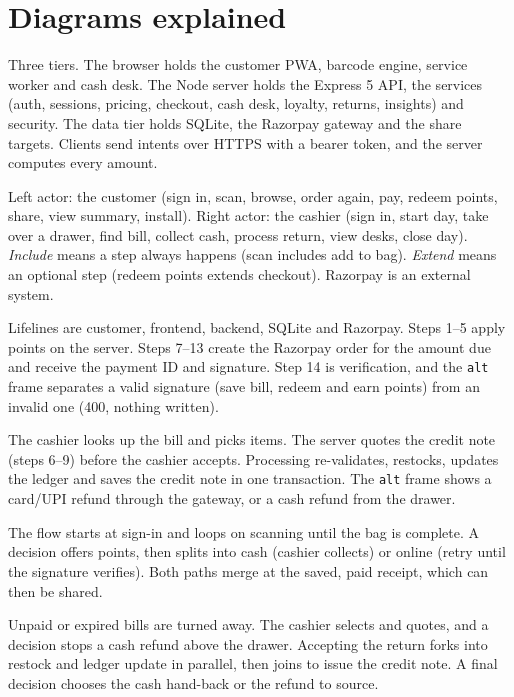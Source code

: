 \documentclass[10pt,a4paper]{article}
\begin{document}
\section{Diagrams explained}
\begin{description}[leftmargin=*,style=nextline,itemsep=2pt]
  \item[Figure 2.1: Architecture] Three tiers. The browser holds the customer PWA, barcode engine, service worker and cash desk. The Node server holds the Express 5 API, the services (auth, sessions, pricing, checkout, cash desk, loyalty, returns, insights) and security. The data tier holds SQLite, the Razorpay gateway and the share targets. Clients send intents over HTTPS with a bearer token, and the server computes every amount.
  \item[Figure 2.3: Use case] Left actor: the customer (sign in, scan, browse, order again, pay, redeem points, share, view summary, install). Right actor: the cashier (sign in, start day, take over a drawer, find bill, collect cash, process return, view desks, close day). \emph{Include} means a step always happens (scan includes add to bag). \emph{Extend} means an optional step (redeem points extends checkout). Razorpay is an external system.
  \item[Figure 2.4: Sequence, checkout with points] Lifelines are customer, frontend, backend, SQLite and Razorpay. Steps 1--5 apply points on the server. Steps 7--13 create the Razorpay order for the amount due and receive the payment ID and signature. Step 14 is verification, and the \texttt{alt} frame separates a valid signature (save bill, redeem and earn points) from an invalid one (400, nothing written).
  \item[Figure 2.5: Sequence, return] The cashier looks up the bill and picks items. The server quotes the credit note (steps 6--9) before the cashier accepts. Processing re-validates, restocks, updates the ledger and saves the credit note in one transaction. The \texttt{alt} frame shows a card/UPI refund through the gateway, or a cash refund from the drawer.
  \item[Figure 2.6: Activity, checkout] The flow starts at sign-in and loops on scanning until the bag is complete. A decision offers points, then splits into cash (cashier collects) or online (retry until the signature verifies). Both paths merge at the saved, paid receipt, which can then be shared.
  \item[Figure 2.7: Activity, return] Unpaid or expired bills are turned away. The cashier selects and quotes, and a decision stops a cash refund above the drawer. Accepting the return forks into restock and ledger update in parallel, then joins to issue the credit note. A final decision chooses the cash hand-back or the refund to source.

\end{description}
\end{document}
